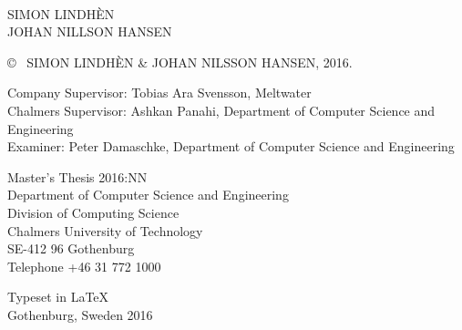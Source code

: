 \newpage
\thispagestyle{plain}
\vspace*{4.5cm}
\maintitle\\
\subtitle\\
SIMON LINDHÈN\\
JOHAN NILLSON HANSEN\setlength{\parskip}{1cm}



\copyright ~ SIMON LINDHÈN \& JOHAN NILSSON HANSEN, 2016. \setlength{\parskip}{1cm}

Company Supervisor: Tobias Ara Svensson, Meltwater\\
Chalmers Supervisor: Ashkan Panahi, Department of Computer Science and Engineering\\
Examiner: Peter Damaschke, Department of Computer Science and Engineering \setlength{\parskip}{1cm}

Master's Thesis 2016:NN\\	%
Department of Computer Science and Engineering\\
Division of Computing Science\\
Chalmers University of Technology\\
SE-412 96 Gothenburg\\
Telephone +46 31 772 1000 \setlength{\parskip}{0.5cm}

\vfill
 \setlength{\parskip}{0.5cm}

Typeset in \LaTeX \\
Gothenburg, Sweden 2016

